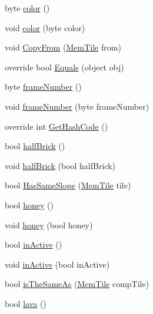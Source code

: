 \begin{DoxyCompactItemize}
\item 
byte \hyperlink{classOTA_1_1Memory_1_1MemTile_a59d1175a84043c5a0aef2127261929ef}{color} ()
\item 
void \hyperlink{classOTA_1_1Memory_1_1MemTile_aa605b53c67026851b988b90969198808}{color} (byte color)
\item 
void \hyperlink{classOTA_1_1Memory_1_1MemTile_aa8c11ffc6ceeaf234234e734605fd545}{Copy\+From} (\hyperlink{classOTA_1_1Memory_1_1MemTile}{Mem\+Tile} from)
\item 
override bool \hyperlink{classOTA_1_1Memory_1_1MemTile_aadf763f0213fc2f3875230b06bb0b6cf}{Equals} (object obj)
\item 
byte \hyperlink{classOTA_1_1Memory_1_1MemTile_ab727e968d9902b1bfaff36cee25b7559}{frame\+Number} ()
\item 
void \hyperlink{classOTA_1_1Memory_1_1MemTile_a332441edddb62e281ed1950eab8f14ba}{frame\+Number} (byte frame\+Number)
\item 
override int \hyperlink{classOTA_1_1Memory_1_1MemTile_a77e1afa2b6dee1ed3640da81d7407b42}{Get\+Hash\+Code} ()
\item 
bool \hyperlink{classOTA_1_1Memory_1_1MemTile_a7955bfcdd5b9c2ec05f82de21a70755e}{half\+Brick} ()
\item 
void \hyperlink{classOTA_1_1Memory_1_1MemTile_a149e135565570f66acc3575a05f027b9}{half\+Brick} (bool half\+Brick)
\item 
bool \hyperlink{classOTA_1_1Memory_1_1MemTile_a61f2621e30481bccac67816fcbc50677}{Has\+Same\+Slope} (\hyperlink{classOTA_1_1Memory_1_1MemTile}{Mem\+Tile} tile)
\item 
bool \hyperlink{classOTA_1_1Memory_1_1MemTile_a7505c6322a432d17e1a8a496f674f8fb}{honey} ()
\item 
void \hyperlink{classOTA_1_1Memory_1_1MemTile_a80bc7ff4149728b47e29e22490943f7f}{honey} (bool honey)
\item 
bool \hyperlink{classOTA_1_1Memory_1_1MemTile_a515f9dc47e3252a149aa0ab21aab8ef5}{in\+Active} ()
\item 
void \hyperlink{classOTA_1_1Memory_1_1MemTile_a83e0b571d4d708618950e276dc509c16}{in\+Active} (bool in\+Active)
\item 
bool \hyperlink{classOTA_1_1Memory_1_1MemTile_add7efbc694fe91040aa67a53c78ee3a9}{is\+The\+Same\+As} (\hyperlink{classOTA_1_1Memory_1_1MemTile}{Mem\+Tile} comp\+Tile)
\item 
bool \hyperlink{classOTA_1_1Memory_1_1MemTile_a825cbfbb2954e89a3de9cb6e2b5134fc}{lava} ()
\item 

\end{DoxyCompactItemize}
